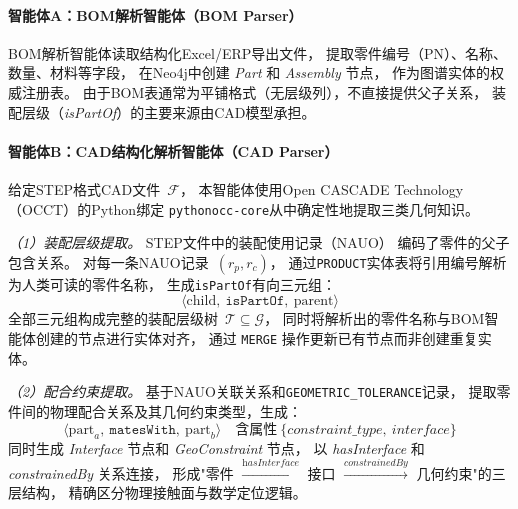 \paragraph{智能体A：BOM解析智能体（BOM Parser）}

BOM解析智能体读取结构化Excel/ERP导出文件，
提取零件编号（PN）、名称、数量、材料等字段，
在Neo4j中创建 \textit{Part} 和 \textit{Assembly} 节点，
作为图谱实体的权威注册表。
由于BOM表通常为平铺格式（无层级列），不直接提供父子关系，
装配层级（\textit{isPartOf}）的主要来源由CAD模型承担。

\paragraph{智能体B：CAD结构化解析智能体（CAD Parser）}

给定STEP格式CAD文件~$\mathcal{F}$，
本智能体使用Open CASCADE Technology（OCCT）的Python绑定
\texttt{pythonocc-core}从中确定性地提取三类几何知识。

\textit{（1）装配层级提取。}
STEP文件中的装配使用记录（NAUO）
编码了零件的父子包含关系。
对每一条NAUO记录~$(r_p, r_c)$，
通过\texttt{PRODUCT}实体表将引用编号解析为人类可读的零件名称，
生成\texttt{isPartOf}有向三元组：
\begin{equation}
  \langle \text{child},\ \texttt{isPartOf},\ \text{parent} \rangle
  \label{eq:ispartof}
\end{equation}
全部三元组构成完整的装配层级树~$\mathcal{T} \subseteq \mathcal{G}$，
同时将解析出的零件名称与BOM智能体创建的节点进行实体对齐，
通过 \texttt{MERGE} 操作更新已有节点而非创建重复实体。

\textit{（2）配合约束提取。}
基于NAUO关联关系和\texttt{GEOMETRIC\_TOLERANCE}记录，
提取零件间的物理配合关系及其几何约束类型，生成：
\begin{equation}
  \langle \text{part}_a,\ \texttt{matesWith},\ \text{part}_b \rangle
  \quad \text{含属性}\ \{\mathit{constraint\_type},\ \mathit{interface}\}
  \label{eq:mateswith}
\end{equation}
同时生成 \textit{Interface} 节点和 \textit{GeoConstraint} 节点，
以 \textit{hasInterface} 和 \textit{constrainedBy} 关系连接，
形成"零件 $\xrightarrow{\textit{hasInterface}}$ 接口
$\xrightarrow{\textit{constrainedBy}}$ 几何约束"的三层结构，
精确区分物理接触面与数学定位逻辑。

